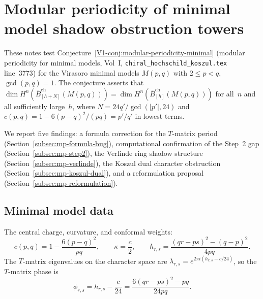 \documentclass[11pt]{article}
\begin{document}
\section{Modular periodicity of minimal model shadow obstruction towers}
\label{sec:modular-periodicity-test}

These notes test Conjecture~\ref*{V1-conj:modular-periodicity-minimal}
(modular periodicity for minimal models, Vol~I,
\texttt{chiral\_hochschild\_koszul.tex} line~3773) for the Virasoro
minimal models $M(p,q)$ with $2 \le p < q$, $\gcd(p,q)=1$.  The
conjecture asserts that $\dim H^n(\bar{B}^{\mathrm{ch}}_{[h+N]}(M(p,q)))
= \dim H^n(\bar{B}^{\mathrm{ch}}_{[h]}(M(p,q)))$ for all~$n$ and all
sufficiently large~$h$, where $N = 24q'/\gcd(|p'|,24)$ and $c(p,q) = 1
- 6(p-q)^2/(pq) = p'/q'$ in lowest terms.

We report five findings: a formula correction for the $T$-matrix period
(Section~\ref{subsec:mp-formula-bug}), computational confirmation of the
Step~2 gap (Section~\ref{subsec:mp-step2}), the Verlinde ring shadow
structure (Section~\ref{subsec:mp-verlinde}), the Koszul dual character
obstruction (Section~\ref{subsec:mp-koszul-dual}), and a reformulation
proposal (Section~\ref{subsec:mp-reformulation}).

\subsection{Minimal model data}\label{subsec:mp-data}

The central charge, curvature, and conformal weights:
\[
c(p,q) = 1 - \frac{6(p-q)^2}{pq}, \qquad
\kappa = \frac{c}{2}, \qquad
h_{r,s} = \frac{(qr-ps)^2 - (q-p)^2}{4pq}.
\]
The $T$-matrix eigenvalues on the character space are
$\lambda_{r,s} = e^{2\pi i(h_{r,s} - c/24)}$,
so the $T$-matrix phase is
\begin{equation}\label{eq:mp-phase}
\phi_{r,s} = h_{r,s} - \frac{c}{24}
= \frac{6(qr-ps)^2 - pq}{24pq}.
\end{equation}
\end{document}
